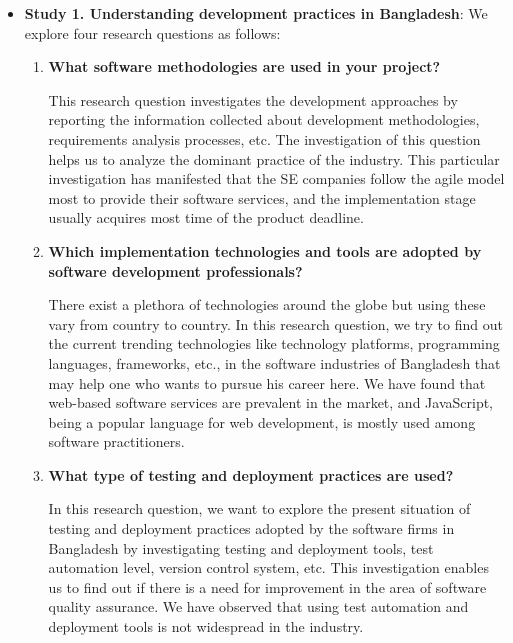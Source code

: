 \begin{itemize}[leftmargin=10pt]

\item \textbf{Study 1. Understanding development practices in Bangladesh}: We explore four research questions as follows:
    \begin{enumerate}[label={\textbf{RQ\arabic{*}.}}, leftmargin=30pt]
    
    \item \textbf{What software methodologies are used in your project?}
    
    This research question investigates the development approaches by reporting the information collected about development methodologies, requirements analysis processes, etc. The investigation of this question helps us to analyze the dominant practice of the industry. This particular investigation has manifested that the SE companies follow the agile model most to provide their software services, and the implementation stage usually acquires most time of the product deadline.
        
    \item \textbf{Which implementation technologies and tools are adopted by software development professionals?}
        
    There exist a plethora of technologies around the globe but using these vary from country to country. In this research question, we try to find out the current trending technologies like technology platforms, programming languages, frameworks, etc., in the software industries of Bangladesh that may help one who wants to pursue his career here. We have found that web-based software services are prevalent in the market, and JavaScript, being a popular language for web development, is mostly used among software practitioners.

        
    \item \textbf{What type of testing and deployment practices are used?}
        
    In this research question, we want to explore the present situation of testing and deployment practices adopted by the software firms in Bangladesh by investigating testing and deployment tools, test automation level, version control system, etc. This investigation enables us to find out if there is a need for improvement in the area of software quality assurance. We have observed that using test automation and deployment tools is not widespread in the industry.
        

\end{enumerate}
\end{itemize}
